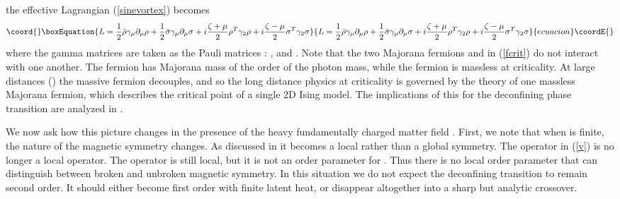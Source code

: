 \documentclass[a4paper,aps,prd,superscriptaddress,showpacs,showkeys]{revtex4}
\begin{document}
the effective Lagrangian (\ref{sinevortex}) becomes
\begin{equation}\coord{}\boxEquation{
L=\frac12\bar\rho\gamma_\mu\partial_\mu\rho+
\frac12 \bar\sigma\gamma_\mu\partial_\mu\sigma+
i\frac{\zeta+\mu}{2}\rho^T \gamma_2 \rho+
i\frac{\zeta-\mu}{2}\sigma^T\gamma_2\sigma
\label{fcrit}
}{
L=\frac12\bar\rho\gamma_\mu\partial_\mu\rho+
\frac12 \bar\sigma\gamma_\mu\partial_\mu\sigma+
i\frac{\zeta+\mu}{2}\rho^T \gamma_2 \rho+
i\frac{\zeta-\mu}{2}\sigma^T\gamma_2\sigma
}{ecuacion}\coordE{}\end{equation}
where the gamma matrices are taken as the
Pauli matrices : \myHighlight{$\gamma_\mu=\tau_\mu$}\coordHE{}, and
\coordHE{}. Note that the
two Majorana fermions \myHighlight{$\rho$}\coordHE{} and \myHighlight{$\sigma$}\coordHE{} in (\ref{fcrit}) do not
interact with one another. The fermion \myHighlight{$\rho$}\coordHE{} has
Majorana mass of the order of the photon mass, while the fermion
\myHighlight{$\sigma$}\coordHE{} is
massless at criticality. At large distances (\coordHE{}) the
massive fermion decouples,  and so the long distance physics at
criticality  is governed by the theory of one
massless Majorana fermion, which describes the critical point of a single
2D Ising model. The implications of this for the deconfining phase
transition are analyzed in
\cite{gg1}.

We now ask how this picture changes in the presence of the heavy
fundamentally charged  matter field \myHighlight{$\Phi$}\coordHE{}.
First, we note that when \coordHE{} is finite, the nature of the magnetic
symmetry
changes. As discussed in \cite{fosco} it becomes a local rather than a
global
symmetry. The operator \coordHE{} in (\ref{v}) is no longer a local operator.
The operator \coordHE{} is still local, but it is not an order parameter for
\coordHE{}. Thus there is no local order parameter that can distinguish
between
broken and unbroken magnetic symmetry. In this situation we do not expect
the  deconfining transition to remain second order. It should either
become first order with finite latent heat, or disappear altogether
into a
sharp but analytic crossover.
\end{document}
